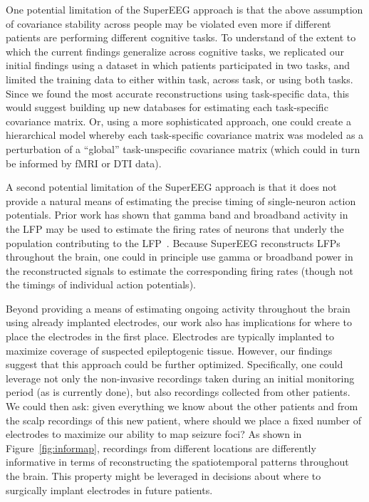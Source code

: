 One potential limitation of the SuperEEG approach is that the above
assumption of covariance stability across people may be violated even
more if different patients are performing different cognitive tasks.
To understand of the extent to which the current findings generalize across
cognitive tasks, we replicated our initial findings using a dataset in which patients participated in two tasks, and limited the training data to either within task, across task, or using both tasks. Since we found the most accurate reconstructions using task-specific data, this would suggest building up new databases for estimating each task-specific covariance
matrix.  Or, using a more sophisticated approach, one could create a
hierarchical model whereby each task-specific covariance matrix was
modeled as a perturbation of a ``global'' task-unspecific covariance
matrix (which could in turn be informed by fMRI or DTI data).

A second potential limitation of the SuperEEG approach is that it
does not provide a natural means of estimating the precise timing of
single-neuron action potentials.  Prior work has shown that gamma band
and broadband activity in the LFP may be used to estimate the firing
rates of neurons that underly the population contributing to the
LFP~\cite{MannEtal09}.  Because SuperEEG reconstructs LFPs throughout
the brain, one could in principle use gamma or broadband power in the
reconstructed signals to estimate the corresponding firing rates
(though not the timings of individual action potentials).

Beyond providing a means of estimating ongoing activity throughout the
brain using already implanted electrodes, our work also has
implications for where to place the electrodes in the first place.
Electrodes are typically implanted to maximize coverage of suspected
epileptogenic tissue.  However, our findings suggest that this approach
could be further optimized.  Specifically, one could leverage not only
the non-invasive recordings taken during an initial monitoring period
(as is currently done), but also recordings collected from other
patients.  We could then ask: given everything we know about the other
patients and from the scalp recordings of this new patient, where
should we place a fixed number of electrodes to maximize our ability
to map seizure foci?  As shown in Figure~\ref{fig:informap}, recordings
from different locations are differently informative in terms of
reconstructing the spatiotemporal patterns throughout the brain.
This property might be leveraged in decisions about where to
surgically implant electrodes in future patients.

